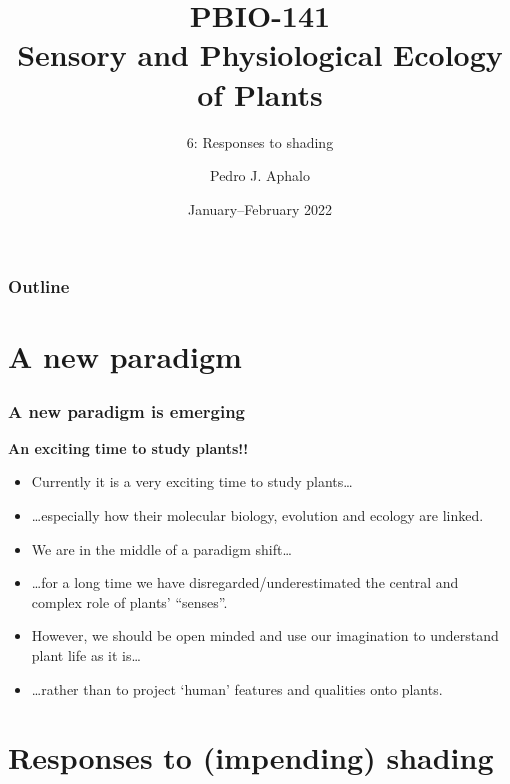 \documentclass[10pt]{beamer}
\begin{document}
\title{PBIO-141\\Sensory and Physiological Ecology\\ of  Plants}
\subtitle{6: Responses to shading}
\author{Pedro J. Aphalo}
\date{January--February 2022}


  \begin{frame}
    \maketitle
  \end{frame}



  \begin{frame}
    \frametitle{Outline}
    \tableofcontents
  \end{frame}

\section{A new paradigm}

\begin{frame}
\frametitle{A new paradigm is emerging}
\textbf{An exciting time to study plants!!}
    \begin{itemize}
      \item Currently it is a very exciting time to study plants\ldots
      \item \ldots especially how their molecular biology, evolution and ecology are linked.
      \item We are in the middle of a paradigm shift\ldots
      \item \ldots for a long time we have disregarded/underestimated the central and complex role of plants' ``senses''.
      \item However, we should be open minded and use our imagination to understand plant life as it is\ldots
      \item \ldots rather than to project `human' features and qualities onto plants.
    \end{itemize}
\end{frame}

\section{Responses to (impending) shading}
\end{document}
